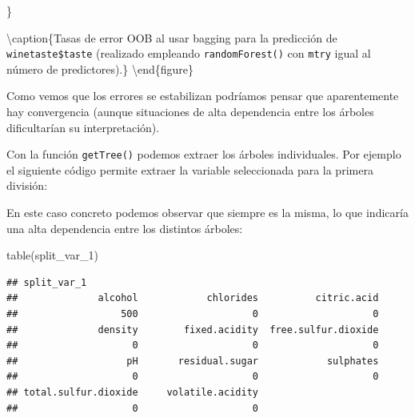 \documentclass[
  spanish,
]{book}
\newenvironment{Shaded}{\begin{snugshade}}{\end{snugshade}}
\newcommand{\AttributeTok}[1]{\textcolor[rgb]{0.77,0.63,0.00}{#1}}
\newcommand{\CommentTok}[1]{\textcolor[rgb]{0.56,0.35,0.01}{\textit{#1}}}
\newcommand{\ConstantTok}[1]{\textcolor[rgb]{0.00,0.00,0.00}{#1}}
\newcommand{\ControlFlowTok}[1]{\textcolor[rgb]{0.13,0.29,0.53}{\textbf{#1}}}
\newcommand{\DecValTok}[1]{\textcolor[rgb]{0.00,0.00,0.81}{#1}}
\newcommand{\FunctionTok}[1]{\textcolor[rgb]{0.00,0.00,0.00}{#1}}
\newcommand{\NormalTok}[1]{#1}
\newcommand{\OtherTok}[1]{\textcolor[rgb]{0.56,0.35,0.01}{#1}}
\newcommand{\SpecialCharTok}[1]{\textcolor[rgb]{0.00,0.00,0.00}{#1}}
\newcommand{\StringTok}[1]{\textcolor[rgb]{0.31,0.60,0.02}{#1}}
\theoremstyle{break}
\theoremstyle{definition}
\theoremstyle{definition}
\theoremstyle{definition}
\theoremstyle{definition}
\theoremstyle{remark}
\begin{document}
\}

\textbackslash caption\{Tasas de error OOB al usar bagging para la predicción de \texttt{winetaste\$taste} (realizado empleando \texttt{randomForest()} con \texttt{mtry} igual al número de predictores).\}\label{fig:bagging-conv}
\textbackslash end\{figure\}

Como vemos que los errores se estabilizan podríamos pensar que aparentemente hay convergencia (aunque situaciones de alta dependencia entre los árboles dificultarían su interpretación).

Con la función \texttt{getTree()} podemos extraer los árboles individuales.
Por ejemplo el siguiente código permite extraer la variable seleccionada para la primera división:

\begin{Shaded}
\end{Shaded}

En este caso concreto podemos observar que siempre es la misma, lo que indicaría una alta dependencia entre los distintos árboles:

\begin{Shaded}
\begin{Highlighting}[]
\FunctionTok{table}\NormalTok{(split\_var\_1)}
\end{Highlighting}
\end{Shaded}

\begin{verbatim}
## split_var_1
##              alcohol            chlorides          citric.acid 
##                  500                    0                    0 
##              density        fixed.acidity  free.sulfur.dioxide 
##                    0                    0                    0 
##                   pH       residual.sugar            sulphates 
##                    0                    0                    0 
## total.sulfur.dioxide     volatile.acidity 
##                    0                    0
\end{verbatim}
\end{document}
